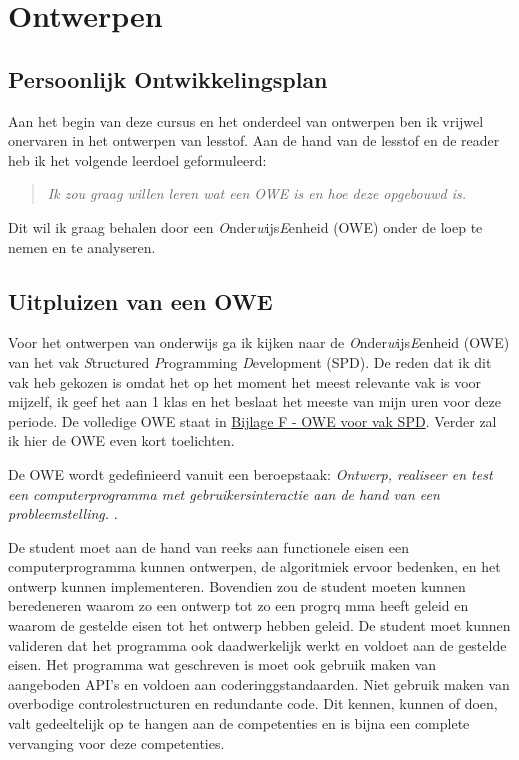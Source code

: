 \section{Ontwerpen}

\subsection{Persoonlijk Ontwikkelingsplan}
Aan het begin van deze cursus en het onderdeel van ontwerpen ben ik vrijwel onervaren in het ontwerpen van lesstof. Aan de hand van de lesstof en de reader heb ik het volgende leerdoel geformuleerd:
\begin{quote}
  \textit{Ik zou graag willen leren wat een OWE is en hoe deze opgebouwd is.}
\end{quote}
Dit wil ik graag behalen door een \textit{O}nder\textit{w}ijs\textit{E}enheid (OWE) onder de loep te nemen en te analyseren.

\subsection{Uitpluizen van een OWE}
Voor het ontwerpen van onderwijs ga ik kijken naar de \textit{O}nder\textit{w}ijs\textit{E}enheid (OWE) van het vak \textit{S}tructured \textit{P}rogramming \textit{D}evelopment (SPD). De reden dat ik dit vak heb gekozen is omdat het op het moment het meest relevante vak is voor mijzelf, ik geef het aan 1 klas en het beslaat het meeste van mijn uren voor deze periode. De volledige OWE staat in \hyperref[sec:owespd]{Bijlage F - OWE voor vak SPD}. Verder zal ik hier de OWE even kort toelichten.

De OWE wordt gedefinieerd vanuit een beroepstaak: \textit{Ontwerp, realiseer en test een computerprogramma met gebruikersinteractie aan de hand van een probleemstelling.
}.

De student moet aan de hand van reeks aan functionele eisen een computerprogramma kunnen ontwerpen, de algoritmiek ervoor bedenken, en het ontwerp kunnen implementeren. Bovendien zou de student moeten kunnen beredeneren waarom zo een ontwerp tot zo een progrq
mma heeft geleid en waarom de gestelde eisen tot het ontwerp hebben geleid. De student moet kunnen valideren dat het programma ook daadwerkelijk werkt en voldoet aan de gestelde eisen. Het programma wat geschreven is moet ook gebruik maken van aangeboden API's  en voldoen aan coderinggstandaarden. Niet gebruik maken van overbodige controlestructuren en redundante code. 
Dit kennen, kunnen of doen, valt gedeeltelijk op te hangen aan de competenties en is bijna een complete vervanging voor deze competenties. 

